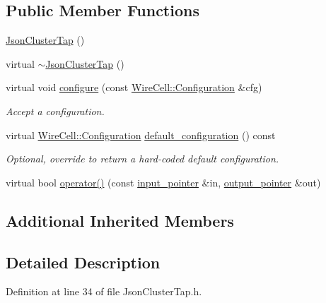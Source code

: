 \subsection*{Public Member Functions}
\begin{DoxyCompactItemize}
\item 
\hyperlink{class_wire_cell_1_1_img_1_1_json_cluster_tap_abc26ab7c3b086ba7c1d9a277b9322c68}{Json\+Cluster\+Tap} ()
\item 
virtual \hyperlink{class_wire_cell_1_1_img_1_1_json_cluster_tap_a1fdba26a9a7a0616d4c3ef95a9727c79}{$\sim$\+Json\+Cluster\+Tap} ()
\item 
virtual void \hyperlink{class_wire_cell_1_1_img_1_1_json_cluster_tap_a00a779a75090a989d816bd6619df86ff}{configure} (const \hyperlink{namespace_wire_cell_a9f705541fc1d46c608b3d32c182333ee}{Wire\+Cell\+::\+Configuration} \&cfg)
\begin{DoxyCompactList}\small\item\em Accept a configuration. \end{DoxyCompactList}\item 
virtual \hyperlink{namespace_wire_cell_a9f705541fc1d46c608b3d32c182333ee}{Wire\+Cell\+::\+Configuration} \hyperlink{class_wire_cell_1_1_img_1_1_json_cluster_tap_adb6f4733f50d1468075362142f097278}{default\+\_\+configuration} () const
\begin{DoxyCompactList}\small\item\em Optional, override to return a hard-\/coded default configuration. \end{DoxyCompactList}\item 
virtual bool \hyperlink{class_wire_cell_1_1_img_1_1_json_cluster_tap_ad1b29dc57145adf2c3b9100a1ee96e56}{operator()} (const \hyperlink{class_wire_cell_1_1_i_function_node_a55c0946156df9b712b8ad1a0b59b2db6}{input\+\_\+pointer} \&in, \hyperlink{class_wire_cell_1_1_i_function_node_afc02f1ec60d31aacddf64963f9ca650b}{output\+\_\+pointer} \&out)
\end{DoxyCompactItemize}
\subsection*{Additional Inherited Members}


\subsection{Detailed Description}


Definition at line 34 of file Json\+Cluster\+Tap.\+h.



